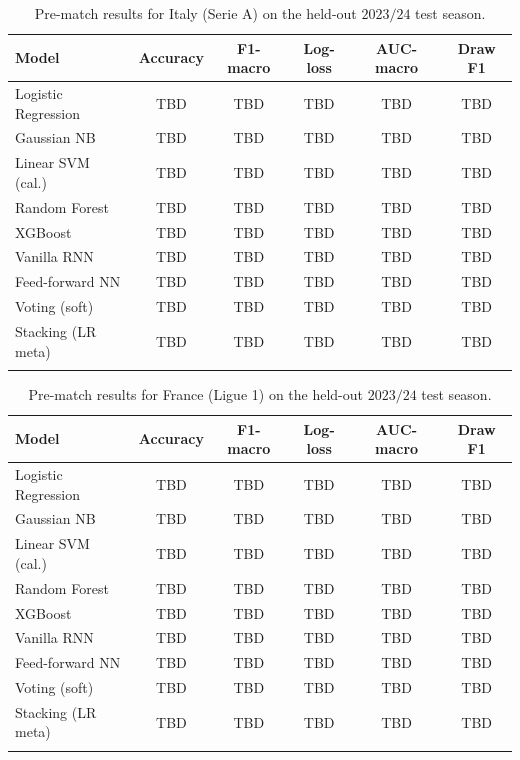 \documentclass[pdflatex,sn-mathphys-num]{sn-jnl}
\theoremstyle{thmstyleone}
\theoremstyle{thmstyletwo}
\theoremstyle{thmstylethree}
\begin{document}
\begin{table}[h]
\caption{Pre-match results for Italy (Serie A) on the held-out
$2023/24$ test season.}\label{tab:pre-ita}
\begin{tabular}{@{}lccccc@{}}
\toprule
Model               & Accuracy & F1-macro & Log-loss & AUC-macro & Draw F1 \\
\midrule
Logistic Regression & TBD & TBD & TBD & TBD & TBD \\
Gaussian NB         & TBD & TBD & TBD & TBD & TBD \\
Linear SVM (cal.)   & TBD & TBD & TBD & TBD & TBD \\
Random Forest       & TBD & TBD & TBD & TBD & TBD \\
XGBoost             & TBD & TBD & TBD & TBD & TBD \\
Vanilla RNN         & TBD & TBD & TBD & TBD & TBD \\
Feed-forward NN     & TBD & TBD & TBD & TBD & TBD \\
\midrule
Voting (soft)       & TBD & TBD & TBD & TBD & TBD \\
Stacking (LR meta)  & TBD & TBD & TBD & TBD & TBD \\
\botrule
\end{tabular}
\end{table}

\begin{table}[h]
\caption{Pre-match results for France (Ligue 1) on the held-out
$2023/24$ test season.}\label{tab:pre-fra}
\begin{tabular}{@{}lccccc@{}}
\toprule
Model               & Accuracy & F1-macro & Log-loss & AUC-macro & Draw F1 \\
\midrule
Logistic Regression & TBD & TBD & TBD & TBD & TBD \\
Gaussian NB         & TBD & TBD & TBD & TBD & TBD \\
Linear SVM (cal.)   & TBD & TBD & TBD & TBD & TBD \\
Random Forest       & TBD & TBD & TBD & TBD & TBD \\
XGBoost             & TBD & TBD & TBD & TBD & TBD \\
Vanilla RNN         & TBD & TBD & TBD & TBD & TBD \\
Feed-forward NN     & TBD & TBD & TBD & TBD & TBD \\
\midrule
Voting (soft)       & TBD & TBD & TBD & TBD & TBD \\
Stacking (LR meta)  & TBD & TBD & TBD & TBD & TBD \\
\botrule
\end{tabular}
\end{table}
\end{document}

